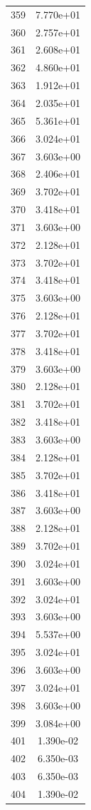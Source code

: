 \documentclass[12pt]{article}
\begin{document}
\begin{longtable}{@{}cc@{}}
359 & 7.770e+01 \\
360 & 2.757e+01 \\
361 & 2.608e+01 \\
362 & 4.860e+01 \\
363 & 1.912e+01 \\
364 & 2.035e+01 \\
365 & 5.361e+01 \\
366 & 3.024e+01 \\
367 & 3.603e+00 \\
368 & 2.406e+01 \\
369 & 3.702e+01 \\
370 & 3.418e+01 \\
371 & 3.603e+00 \\
372 & 2.128e+01 \\
373 & 3.702e+01 \\
374 & 3.418e+01 \\
375 & 3.603e+00 \\
376 & 2.128e+01 \\
377 & 3.702e+01 \\
378 & 3.418e+01 \\
379 & 3.603e+00 \\
380 & 2.128e+01 \\
381 & 3.702e+01 \\
382 & 3.418e+01 \\
383 & 3.603e+00 \\
384 & 2.128e+01 \\
385 & 3.702e+01 \\
386 & 3.418e+01 \\
387 & 3.603e+00 \\
388 & 2.128e+01 \\
389 & 3.702e+01 \\
390 & 3.024e+01 \\
391 & 3.603e+00 \\
392 & 3.024e+01 \\
393 & 3.603e+00 \\
394 & 5.537e+00 \\
395 & 3.024e+01 \\
396 & 3.603e+00 \\
397 & 3.024e+01 \\
398 & 3.603e+00 \\
399 & 3.084e+00 \\
401 & 1.390e-02 \\
402 & 6.350e-03 \\
403 & 6.350e-03 \\
404 & 1.390e-02 \\

\end{longtable}
\end{document}
